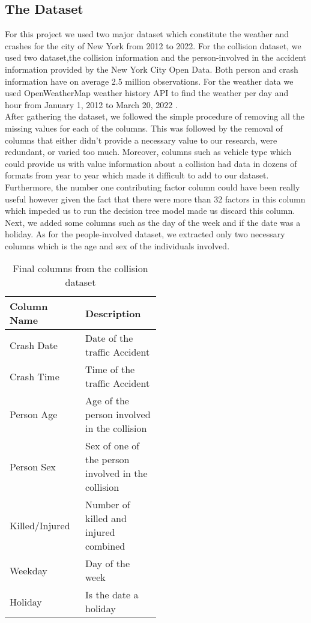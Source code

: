 \documentclass[conference]{IEEEtran}
\begin{document}
	\subsection{The Dataset}
		For this project we used two major dataset which constitute the weather and crashes for the city of New York from 2012 to 2022. For the collision dataset, we used two dataset,the collision information and the person-involved in the accident information provided by the New York City Open Data\cite{data_nyc_nodate}. Both person and crash information have on average 2.5 million observations. For the weather data we used OpenWeatherMap weather history API to find the weather per day and hour from January 1, 2012 to March 20, 2022 \cite{noauthor_urrent_nodate}.
		\\
		After gathering the dataset, we followed the simple procedure of removing all the missing values for each of the columns. This was followed by the removal of columns that either didn't provide a necessary value to our research, were redundant, or varied too much. Moreover, columns such as vehicle type which could provide us with value information about a collision had data in dozens of formats from year to year which made it difficult to add to our dataset. Furthermore, the number one contributing factor column could have been really useful however given the fact that there were more than 32 factors in this column which impeded us to run the decision tree model made us discard this column. Next, we added some columns such as the day of the week and if the date was a holiday. As for the people-involved dataset, we extracted only two necessary columns which is the age and sex of the individuals involved.
		\begin{table}[H]
			\centering
			\begin{tabular}{|l|p{0.5\linewidth}|}
				\hline
				\textbf{Column Name} & \textbf{Description}                               \\ \hline
				Crash Date           & Date of the traffic Accident                       \\ \hline
				Crash Time           & Time of the traffic Accident                       \\ \hline
				Person Age           & Age of the person involved in the collision        \\ \hline
				Person Sex           & Sex of one of the person involved in the collision \\ \hline
				Killed/Injured       & Number of killed and injured combined              \\ \hline
				Weekday              & Day of the week                                    \\ \hline
				Holiday              & Is the date a holiday                              \\ \hline
			\end{tabular}
			\caption{Final columns from the collision dataset}
		\end{table}
\end{document}
